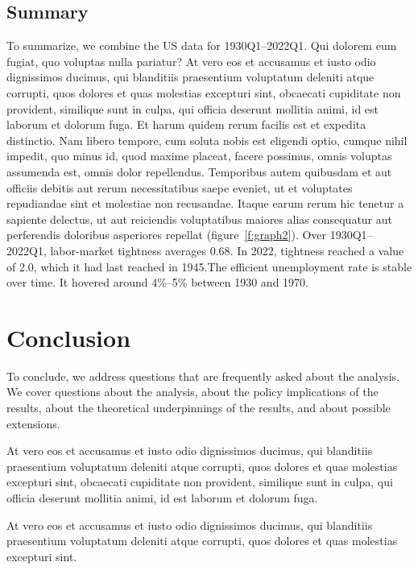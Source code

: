 \documentclass[letterpaper,12pt,leqno]{article}
\newcommand{\bib}{bibliography.bib}
\begin{document}
\subsection{Summary}

To summarize, we combine the US data for 1930Q1--2022Q1. Qui dolorem eum fugiat, quo voluptas nulla pariatur? At vero eos et accusamus et iusto odio dignissimos ducimus, qui blanditiis praesentium voluptatum deleniti atque corrupti, quos dolores et quas molestias excepturi sint, obcaecati cupiditate non provident, similique sunt in culpa, qui officia deserunt mollitia animi, id est laborum et dolorum fuga. Et harum quidem rerum facilis est et expedita distinctio. Nam libero tempore, cum soluta nobis est eligendi optio, cumque nihil impedit, quo minus id, quod maxime placeat, facere possimus, omnis voluptas assumenda est, omnis dolor repellendus. Temporibus autem quibusdam et aut officiis debitis aut rerum necessitatibus saepe eveniet, ut et voluptates repudiandae sint et molestiae non recusandae. Itaque earum rerum hic tenetur a sapiente delectus, ut aut reiciendis voluptatibus maiores alias consequatur aut perferendis doloribus asperiores repellat (figure~\ref{f:graph2}). Over 1930Q1--2022Q1, labor-market tightness averages $0.68$. In 2022, tightness reached a value of 2.0, which it had last reached in 1945.The efficient unemployment rate is stable over time. It hovered around 4\%--5\% between 1930 and 1970.

\section{Conclusion}\label{s:ccl}

To conclude, we address questions that are frequently asked about the analysis. We cover questions about the analysis, about the policy implications of the results, about the theoretical underpinnings of the results, and about possible extensions.

At vero eos et accusamus et iusto odio dignissimos ducimus, qui blanditiis praesentium voluptatum deleniti atque corrupti, quos dolores et quas molestias excepturi sint, obcaecati cupiditate non provident, similique sunt in culpa, qui officia deserunt mollitia animi, id est laborum et dolorum fuga. 

At vero eos et accusamus et iusto odio dignissimos ducimus, qui blanditiis praesentium voluptatum deleniti atque corrupti, quos dolores et quas molestias excepturi sint.



\end{document}
